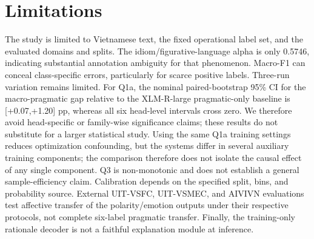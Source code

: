 \section{Limitations}

The study is limited to Vietnamese text, the fixed operational label set, and the evaluated domains and splits. The idiom/figurative-language alpha is only 0.5746, indicating substantial annotation ambiguity for that phenomenon. Macro-F1 can conceal class-specific errors, particularly for scarce positive labels. Three-run variation remains limited. For Q1a, the nominal paired-bootstrap 95\% CI for the macro-pragmatic gap relative to the XLM-R-large pragmatic-only baseline is [+0.07,+1.20] pp, whereas all six head-level intervals cross zero. We therefore avoid head-specific or family-wise significance claims; these results do not substitute for a larger statistical study. Using the same Q1a training settings reduces optimization confounding, but the systems differ in several auxiliary training components; the comparison therefore does not isolate the causal effect of any single component. Q3 is non-monotonic and does not establish a general sample-efficiency claim. Calibration depends on the specified split, bins, and probability source. External UIT-VSFC, UIT-VSMEC, and AIVIVN evaluations test affective transfer of the polarity/emotion outputs under their respective protocols, not complete six-label pragmatic transfer. Finally, the training-only rationale decoder is not a faithful explanation module at inference.
